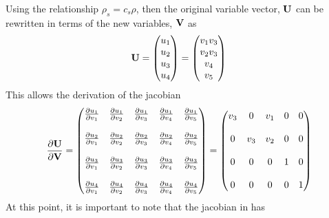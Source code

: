 \documentclass[a4paper]{report}
\begin{document}
Using the relationship $\rho_s = c_s \rho$, then the original variable vector,
$\mathbf U$ can be rewritten in terms of the new variables, $\mathbf V$ as
\begin{equation}
  \mathbf U = \begin{pmatrix}
    u_1 \\
    u_2 \\
    u_3 \\
    u_4
  \end{pmatrix}
  =
  \begin{pmatrix}
    v_1 v_3 \\
    v_2 v_3 \\
    v_4 \\
    v_5
  \end{pmatrix}
  \label{u-to-v}
\end{equation}
This allows the derivation of the jacobian 
\begin{equation}
  \frac{\partial \mathbf U}{\partial \mathbf V} = 
  \begin{pmatrix}
    \frac{\partial u_1}{\partial v_1} & \frac{\partial u_1}{\partial v_2} & \frac{\partial u_1}{\partial v_3} & \frac{\partial u_1}{\partial v_4} & \frac{\partial u_1}{\partial v_5} \\ \\
    \frac{\partial u_2}{\partial v_1} & \frac{\partial u_2}{\partial v_2} & \frac{\partial u_2}{\partial v_3} & \frac{\partial u_2}{\partial v_4} & \frac{\partial u_2}{\partial v_5} \\ \\
    \frac{\partial u_3}{\partial v_1} & \frac{\partial u_3}{\partial v_2} & \frac{\partial u_3}{\partial v_3} & \frac{\partial u_3}{\partial v_4} & \frac{\partial u_3}{\partial v_5} \\ \\
    \frac{\partial u_4}{\partial v_1} & \frac{\partial u_4}{\partial v_2} & \frac{\partial u_4}{\partial v_3} & \frac{\partial u_4}{\partial v_4} & \frac{\partial u_4}{\partial v_5}
  \end{pmatrix}
  =
  \begin{pmatrix}
    v_3 & 0   & v_1 & 0 & 0 \\ \\
    0   & v_3 & v_2 & 0 & 0 \\ \\
    0   & 0   & 0   & 1 & 0 \\ \\
    0   & 0   & 0   & 0 & 1
  \end{pmatrix}
  \label{dudv-jac}
\end{equation}
At this point, it is important to note that the jacobian in  has
\end{document}
